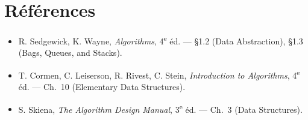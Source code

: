 \documentclass[11pt,a4paper]{article}
\theoremstyle{definition}
\theoremstyle{remark}
\begin{document}
\section*{Références}

\begin{itemize}[nosep]
    \item R. Sedgewick, K. Wayne, \emph{Algorithms}, 4\textsuperscript{e} éd.
          --- §1.2 (Data Abstraction), §1.3 (Bags, Queues, and Stacks).
    \item T. Cormen, C. Leiserson, R. Rivest, C. Stein,
          \emph{Introduction to Algorithms}, 4\textsuperscript{e} éd.
          --- Ch.~10 (Elementary Data Structures).
    \item S. Skiena, \emph{The Algorithm Design Manual},
          3\textsuperscript{e} éd. --- Ch.~3 (Data Structures).
\end{itemize}
\end{document}
